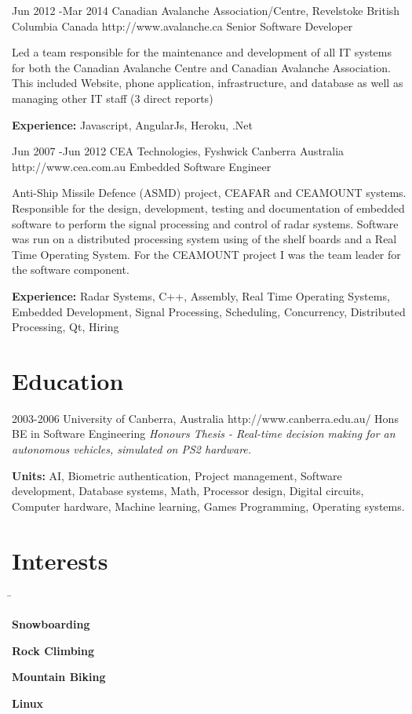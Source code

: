 \documentclass{article}
\begin{document}
\begin{job}
{Jun 2012 -}{Mar 2014}
{Canadian Avalanche Association/Centre, Revelstoke British Columbia Canada}
{http://www.avalanche.ca}
{Senior Software Developer}%
{Led a team responsible for the maintenance and development of all IT systems for both the Canadian Avalanche Centre and Canadian Avalanche Association. This included Website, phone application, infrastructure, and database as well as managing other IT staff (3 direct reports)\\
\rule{0mm}{5mm}\textbf{Experience:} Javascript, AngularJs, Heroku, .Net} 
\end{job}

\begin{job}
{Jun 2007 -}{Jun 2012}
{CEA Technologies, Fyshwick Canberra Australia}
{http://www.cea.com.au}
{Embedded Software Engineer}%
{Anti-Ship Missile Defence (ASMD) project, CEAFAR and CEAMOUNT systems. Responsible for the design, development, testing and documentation of embedded software to perform the signal processing and control of radar systems. Software was run on a distributed processing system using of the shelf boards and a Real Time Operating System. For the CEAMOUNT project I was the team leader for the software component.\\
\rule{0mm}{5mm}\textbf{Experience:} Radar Systems, C++, Assembly, Real Time Operating Systems, Embedded Development, Signal Processing, Scheduling, Concurrency, Distributed Processing, Qt, Hiring} 
\end{job}

\section*{Education}

\begin{education}
{2003-2006}
{University of Canberra, Australia} 
{http://www.canberra.edu.au/} 
{Hons BE in Software Engineering}%
\textit{Honours Thesis - Real-time decision making for an autonomous vehicles, simulated
on PS2 hardware.}\\
\rule{0mm}{5mm}\textbf{Units:} {AI, Biometric authentication, Project management, Software development, Database systems, Math, Processor design, Digital circuits, Computer hardware, Machine learning, Games Programming, Operating systems.} 
\end{education}

\section*{Interests}

\begin{tabbing}
\hspace{5mm} \= \kill
\rule{0mm}{4mm}\sqbullet \> \textbf{Snowboarding}\\
\rule{0mm}{4mm}\sqbullet \> \textbf{Rock Climbing} \\
\rule{0mm}{4mm}\sqbullet \> \textbf{Mountain Biking} \\
\rule{0mm}{4mm}\sqbullet \> \textbf{Linux} \\
\end{tabbing}
\end{document}
